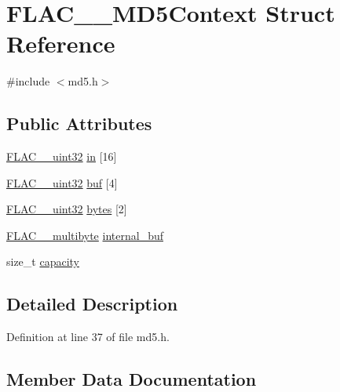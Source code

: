 \hypertarget{struct_f_l_a_c_____m_d5_context}{}\section{F\+L\+A\+C\+\_\+\+\_\+\+M\+D5\+Context Struct Reference}
\label{struct_f_l_a_c_____m_d5_context}


{\ttfamily \#include $<$md5.\+h$>$}

\subsection*{Public Attributes}
\begin{DoxyCompactItemize}
\item 
\hyperlink{ordinals_8h_a9c4005ea7ef8d564b0cc993cdd0e4e5e}{F\+L\+A\+C\+\_\+\+\_\+uint32} \hyperlink{struct_f_l_a_c_____m_d5_context_adfd8c61d39529ba86c35002bcd557d69}{in} \mbox{[}16\mbox{]}
\item 
\hyperlink{ordinals_8h_a9c4005ea7ef8d564b0cc993cdd0e4e5e}{F\+L\+A\+C\+\_\+\+\_\+uint32} \hyperlink{struct_f_l_a_c_____m_d5_context_a7dd3d0c0eb260f86416b2e8bff622d67}{buf} \mbox{[}4\mbox{]}
\item 
\hyperlink{ordinals_8h_a9c4005ea7ef8d564b0cc993cdd0e4e5e}{F\+L\+A\+C\+\_\+\+\_\+uint32} \hyperlink{struct_f_l_a_c_____m_d5_context_aebfc21f5b69155bcfeecec943671c626}{bytes} \mbox{[}2\mbox{]}
\item 
\hyperlink{union_f_l_a_c____multibyte}{F\+L\+A\+C\+\_\+\+\_\+multibyte} \hyperlink{struct_f_l_a_c_____m_d5_context_ab8c8bfa92a7a68d9aea5bf900b800fe2}{internal\+\_\+buf}
\item 
size\+\_\+t \hyperlink{struct_f_l_a_c_____m_d5_context_a5d61a6ea6ac40a2d1fd701dbf23285a5}{capacity}
\end{DoxyCompactItemize}


\subsection{Detailed Description}


Definition at line 37 of file md5.\+h.



\subsection{Member Data Documentation}
